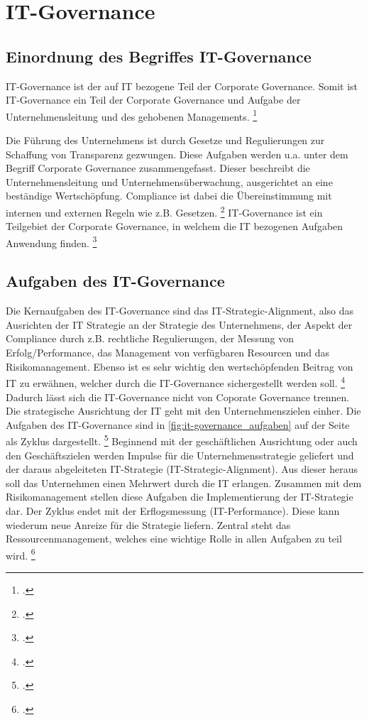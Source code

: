 \section{IT-Governance}

\subsection{Einordnung des Begriffes IT-Governance}
\label{section:einordung_it-governance}
IT-Governance ist der auf IT bezogene Teil der Corporate Governance. Somit ist IT-Governance ein Teil der Corporate Governance und Aufgabe der Unternehmensleitung und des gehobenen Managements. \footcite[Vgl.][445]{meyer_it-governance_2003}

Die Führung des Unternehmens ist durch Gesetze und Regulierungen zur Schaffung von Transparenz gezwungen. Diese Aufgaben werden u.a. unter dem Begriff Corporate Governance zusammengefasst. Dieser beschreibt die Unternehmensleitung und Unternehmensüberwachung, ausgerichtet an eine beständige Wertschöpfung. Compliance ist dabei die Übereinstimmung mit internen und externen Regeln wie z.B. Gesetzen. \footcite[Vgl.][356]{hofmann_it-governance_2010}
IT-Governance ist ein Teilgebiet der Corporate Governance, in welchem die IT bezogenen Aufgaben Anwendung finden. \footcite[Vgl.][10]{johannsen_it-governance_2006}

\subsection{Aufgaben des IT-Governance}

Die Kernaufgaben des IT-Governance sind das IT-Strategic-Alignment, also das Ausrichten der IT Strategie an der Strategie des Unternehmens, der Aspekt der Compliance durch z.B. rechtliche Regulierungen, der Messung von Erfolg/Performance, das Management von verfügbaren Resourcen und das Risikomanagement. Ebenso ist es sehr wichtig den wertschöpfenden Beitrag von IT zu erwähnen, welcher durch die IT-Governance sichergestellt werden soll. \footcite[Vgl.][14]{johannsen_it-governance_2006} Dadurch lässt sich die IT-Governance nicht von Coporate Governance trennen. Die strategische Ausrichtung der IT geht mit den Unternehmenszielen einher. Die Aufgaben des IT-Governance sind in \cref{fig:it-governance_aufgaben} auf der Seite \pageref{fig:it-governance_aufgaben} als Zyklus dargestellt. \footcite[Vgl.][446]{meyer_it-governance_2003} Beginnend mit der geschäftlichen Ausrichtung oder auch den Geschäftszielen werden Impulse für die Unternehmensstrategie geliefert und der daraus abgeleiteten IT-Strategie (IT-Strategic-Alignment). Aus dieser heraus soll das Unternehmen einen Mehrwert durch die IT erlangen. Zusammen mit dem Risikomanagement stellen diese Aufgaben die Implementierung der IT-Strategie dar. Der Zyklus endet mit der Erflogsmessung (IT-Performance). Diese kann wiederum neue Anreize für die Strategie liefern. Zentral steht das Ressourcenmanagement, welches eine wichtige Rolle in allen Aufgaben zu teil wird. \footcite[Vgl.][357\psq]{hofmann_it-governance_2010}

